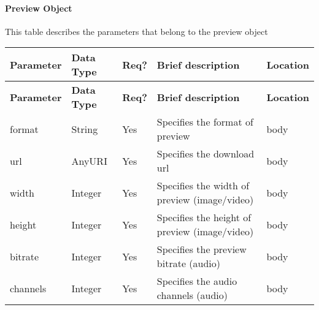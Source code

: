 
\paragraph*{Preview Object}

This table describes the parameters that belong to the preview object

{\footnotesize{}}%
\begin{longtable}{|>{\raggedright}p{}|>{\raggedright}p{}|>{\raggedright}p{}|>{\raggedright}p{}|>{\raggedright}p{}|}
\hline
\hline 
\textbf{\footnotesize{Parameter }} & \textbf{\footnotesize{Data Type}} & \textbf{\footnotesize{Req?}} & \textbf{\footnotesize{Brief description}} & \textbf{\footnotesize{Location}}\tabularnewline
\hline 
\hline
\endfirsthead
\hline
\hline 
\textbf{\footnotesize{Parameter }} & \textbf{\footnotesize{Data Type}} & \textbf{\footnotesize{Req?}} & \textbf{\footnotesize{Brief description}} & \textbf{\footnotesize{Location}}\tabularnewline
\hline 
\hline
\endhead
\hline 
{\footnotesize{format }} & {\footnotesize{String }} & {\footnotesize{Yes}} & {\footnotesize{Specifies the format of preview }} & {\footnotesize{body}}\tabularnewline
\hline 
{\footnotesize{url }} & {\footnotesize{AnyURI }} & {\footnotesize{Yes}} & {\footnotesize{Specifies the download url }} & {\footnotesize{body}}\tabularnewline
\hline 
{\footnotesize{width }} & {\footnotesize{Integer }} & {\footnotesize{Yes}} & {\footnotesize{Specifies the width of preview (image/video) }} & {\footnotesize{body}}\tabularnewline
\hline 
{\footnotesize{height }} & {\footnotesize{Integer }} & {\footnotesize{Yes}} & {\footnotesize{Specifies the height of preview (image/video) }} & {\footnotesize{body}}\tabularnewline
\hline 
{\footnotesize{bitrate }} & {\footnotesize{Integer }} & {\footnotesize{Yes}} & {\footnotesize{Specifies the preview bitrate (audio) }} & {\footnotesize{body}}\tabularnewline
\hline 
{\footnotesize{channels }} & {\footnotesize{Integer }} & {\footnotesize{Yes}} & {\footnotesize{Specifies the audio channels (audio) }} & {\footnotesize{body}}\tabularnewline
\hline 
\end{longtable}{\footnotesize \par}

{\footnotesize{}}
